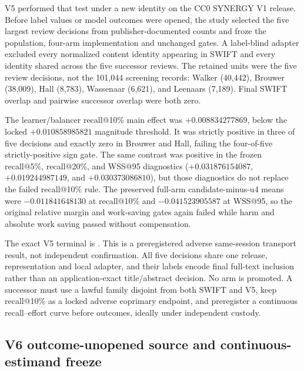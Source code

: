 V5 performed that test under a new identity on the CC0 SYNERGY V1 release.
Before label values or model outcomes were opened, the study selected the five
largest review decisions from publisher-documented counts and froze the
population, four-arm implementation and unchanged gates.  A label-blind
adapter excluded every normalized content identity appearing in SWIFT and
every identity shared across the five successor reviews.  The retained units
were the five review decisions, not the 101,044 screening records: Walker
(40,442), Brouwer (38,009), Hall (8,783), Wassenaar (6,621), and Leenaars
(7,189).  Final SWIFT overlap and pairwise successor overlap were both zero.

The learner/balancer recall@10\% main effect was $+0.008834277869$, below the
locked $+0.010858985821$ magnitude threshold.  It was strictly positive in
three of five decisions and exactly zero in Brouwer and Hall, failing the
four-of-five strictly-positive sign gate.  The same contrast was positive in
the frozen recall@5\%, recall@20\%, and WSS@95 diagnostics
($+0.031876154087$, $+0.019244987149$, and $+0.030373086810$), but those
diagnostics do not replace the failed recall@10\% rule.  The preserved full-arm
candidate-minus-u4 means were $-0.011841648130$ at recall@10\% and
$-0.041523905587$ at WSS@95, so the original relative margin and work-saving
gates again failed while harm and absolute work saving passed without
compensation.

The exact V5 terminal is
.
This is a preregistered adverse same-session transport result, not independent
confirmation.  All five decisions share one release, representation and local
adapter, and their labels encode final full-text inclusion rather than an
application-exact title/abstract decision.  No arm is promoted.  A successor
must use a lawful family disjoint from both SWIFT and V5, keep recall@10\% as a
locked adverse coprimary endpoint, and preregister a continuous recall--effort
curve before outcomes, ideally under independent custody.

\subsection{V6 outcome-unopened source and continuous-estimand freeze}

